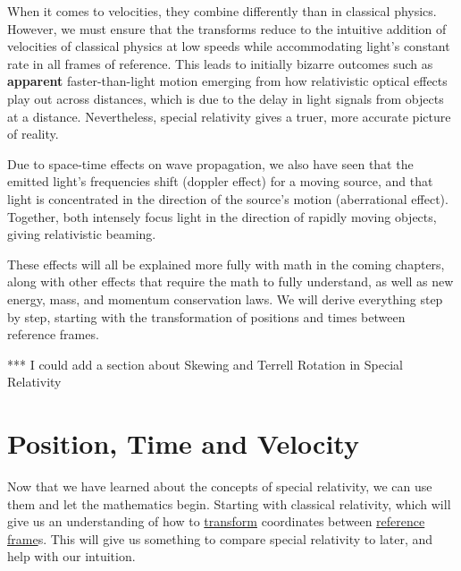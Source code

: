 When it comes to velocities, they combine differently than in classical physics.
However, we must ensure that the transforms reduce to the intuitive addition of velocities of classical physics at low speeds while accommodating light's constant rate in all frames of reference.
This leads to initially bizarre outcomes such as \textbf{apparent} faster-than-light motion emerging from how relativistic optical effects play out across distances, which is due to the delay in light signals from objects at a distance.
Nevertheless, special relativity gives a truer, more accurate picture of reality.

Due to space-time effects on wave propagation, we also have seen that the emitted light's frequencies shift (doppler effect) for a moving source, and that light is concentrated in the direction of the source's motion (aberrational effect).
Together, both intensely focus light in the direction of rapidly moving objects, giving relativistic beaming.

These effects will all be explained more fully with math in the coming chapters, along with other effects that require the math to fully understand, as well as new energy, mass, and momentum conservation laws.
We will derive everything step by step, starting with the transformation of positions and times between reference frames.



*** I could add a section about Skewing and Terrell Rotation in Special Relativity

\printbibliography[segment=\therefsegment, heading=subbibliography] %

\chapter{Position, Time and Velocity} \label{ch: Position, Time and Velocity} %

Now that we have learned about the concepts of special relativity, we can use them and let the mathematics begin.
Starting with classical relativity, which will give us an understanding of how to \hyperlink{def-transform}{transform} coordinates between \hyperlink{def-Reference-frame}{reference frame}s.
This will give us something to compare special relativity to later, and help with our intuition.

